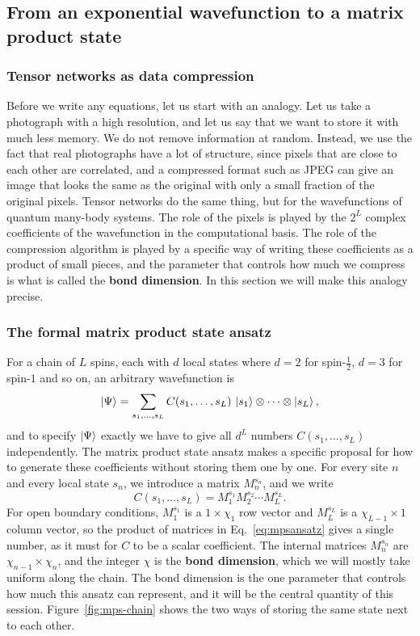 \documentclass[lecture_notes.tex]{subfiles}
\begin{document}
\subsection{From an exponential wavefunction to a matrix product state}

\subsubsection{Tensor networks as data compression}
Before we write any equations, let us start with an analogy. Let us take a photograph with a high
resolution, and let us say that we want to store it with much less memory. We do not remove
information at random. Instead, we use the fact that real photographs have a lot of structure,
since pixels that are close to each other are correlated, and a compressed format such as JPEG can
give an image that looks the same as the original with only a small fraction of the original
pixels. Tensor networks do the same thing, but for the wavefunctions of quantum many-body systems.
The role of the pixels is played by the $2^L$ complex coefficients of the wavefunction in the
computational basis. The role of the compression algorithm is played by a specific way of writing
these coefficients as a product of small pieces, and the parameter that controls how much we
compress is what is called the \textbf{bond dimension}. In this section we will make this analogy
precise.

\subsubsection{The formal matrix product state ansatz}
For a chain of $L$ spins, each with $d$ local states where $d=2$ for spin-$\tfrac12$, $d=3$ for
spin-$1$ and so on, an arbitrary wavefunction is
\begin{equation}
  \ket{\Psi} = \sum_{s_1,\ldots,s_L} C(s_1,\ldots,s_L)\, \ket{s_1}\otimes\cdots\otimes\ket{s_L},
  \label{eq:generalwf}
\end{equation}
and to specify $\ket{\Psi}$ exactly we have to give all $d^L$ numbers $C(s_1,\ldots,s_L)$
independently. The matrix product state ansatz makes a specific proposal for how to generate these
coefficients without storing them one by one. For every site $n$ and every local state $s_n$, we
introduce a matrix $M_n^{s_n}$, and we write
\begin{equation}
  C(s_1,\ldots,s_L) = M_1^{s_1} M_2^{s_2} \cdots M_L^{s_L}.
  \label{eq:mpsansatz}
\end{equation}
For open boundary conditions, $M_1^{s_1}$ is a $1\times\chi_1$ row vector and $M_L^{s_L}$ is a
$\chi_{L-1}\times 1$ column vector, so the product of matrices in Eq.~\eqref{eq:mpsansatz} gives a
single number, as it must for $C$ to be a scalar coefficient. The internal matrices $M_n^{s_n}$ are
$\chi_{n-1}\times \chi_n$, and the integer $\chi$ is the \textbf{bond dimension}, which we will
mostly take uniform along the chain. The bond dimension is the one parameter that controls how much
this ansatz can represent, and it will be the central quantity of this session.
Figure~\ref{fig:mps-chain} shows the two ways of storing the same state next to each other.
\end{document}
